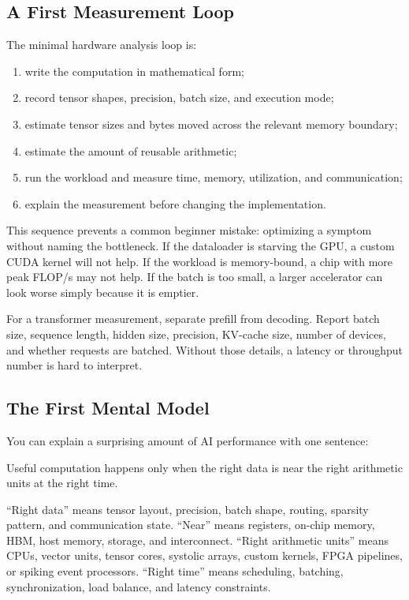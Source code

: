 \subsection{A First Measurement Loop}

The minimal hardware analysis loop is:
\begin{enumerate}
  \item write the computation in mathematical form;
  \item record tensor shapes, precision, batch size, and execution mode;
  \item estimate tensor sizes and bytes moved across the relevant memory boundary;
  \item estimate the amount of reusable arithmetic;
  \item run the workload and measure time, memory, utilization, and communication;
  \item explain the measurement before changing the implementation.
\end{enumerate}

This sequence prevents a common beginner mistake: optimizing a symptom without naming the bottleneck. If the dataloader is starving the GPU, a custom CUDA kernel will not help. If the workload is memory-bound, a chip with more peak FLOP/s may not help. If the batch is too small, a larger accelerator can look worse simply because it is emptier.

For a transformer measurement, separate prefill from decoding. Report batch size, sequence length, hidden size, precision, KV-cache size, number of devices, and whether requests are batched. Without those details, a latency or throughput number is hard to interpret.

\subsection{The First Mental Model}

You can explain a surprising amount of AI performance with one sentence:

\begin{aside}
Useful computation happens only when the right data is near the right arithmetic units at the right time.
\end{aside}

``Right data'' means tensor layout, precision, batch shape, routing, sparsity pattern, and communication state. ``Near'' means registers, on-chip memory, HBM, host memory, storage, and interconnect. ``Right arithmetic units'' means CPUs, vector units, tensor cores, systolic arrays, custom kernels, FPGA pipelines, or spiking event processors. ``Right time'' means scheduling, batching, synchronization, load balance, and latency constraints.

